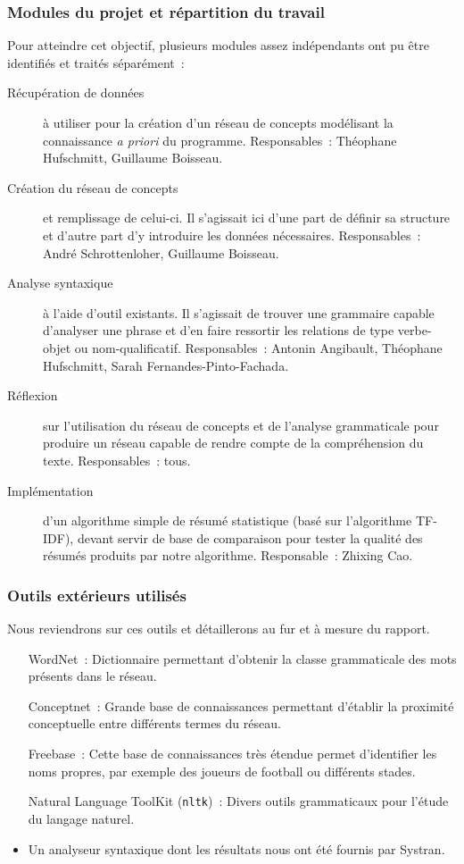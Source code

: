 \documentclass[a4paper, 12pt]{article}
\newcommand{\pyt}[1]{\texttt{#1}}%
\begin{document}
\subsubsection{Modules du projet et répartition du travail}

Pour atteindre cet objectif, plusieurs modules assez indépendants ont pu être identifiés et traités séparément~:

\begin{description}
	\item[Récupération de données] à utiliser pour la création d'un réseau de concepts modélisant la connaissance \textit{a priori} du programme. Responsables~: Théophane Hufschmitt, Guillaume Boisseau.
	\item[Création du réseau de concepts] et remplissage de celui-ci. Il s'agissait ici d'une part de définir sa structure et d'autre part d'y introduire les données nécessaires. Responsables~: André Schrottenloher, Guillaume Boisseau.
	\item[Analyse syntaxique] à l'aide d'outil existants. Il s'agissait de trouver une grammaire capable d'analyser une phrase et d'en faire ressortir les relations de type verbe-objet ou nom-qualificatif. Responsables~: Antonin Angibault, Théophane Hufschmitt, Sarah Fernandes-Pinto-Fachada.
	\item[Réflexion] sur l'utilisation du réseau de concepts et de l'analyse grammaticale pour produire un réseau capable de rendre compte de la compréhension du texte. Responsables~: tous.
	\item[Implémentation] d'un algorithme simple de résumé statistique (basé sur l'algorithme TF-IDF), devant servir de base de comparaison pour tester la qualité des résumés produits par notre algorithme.  Responsable~: Zhixing Cao.
\end{description}

\subsubsection{Outils extérieurs utilisés}

Nous reviendrons sur ces outils et détaillerons au fur et à mesure du rapport.

\begin{itemize}
	\item[WordNet~: ]Dictionnaire permettant d'obtenir la classe grammaticale des mots présents dans le réseau.
	\item[Conceptnet~: ]Grande base de connaissances permettant d'établir la proximité conceptuelle entre différents termes du réseau.
	\item[Freebase~: ]Cette base de connaissances très étendue permet d'identifier les noms propres, par exemple des joueurs de football ou différents stades.
	\item[Natural Language ToolKit (\pyt{nltk})~: ]Divers outils grammaticaux pour l'étude du langage naturel.
	\item Un analyseur syntaxique dont les résultats nous ont été fournis par Systran.
\end{itemize}
\end{document}
